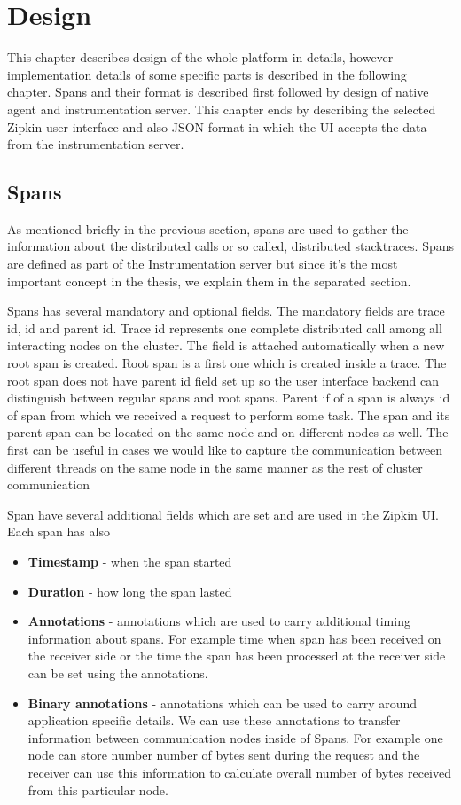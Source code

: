 \chapter{Design}
This chapter describes design of the whole platform in details, however implementation details of some specific parts is described in the following chapter. Spans and their format is described first followed by design of native agent and instrumentation server. This chapter ends by describing the selected Zipkin user interface and also JSON format in which the UI accepts the data from the instrumentation server.
\label{chap:design}

\section{Spans}
\label{subsec:spans}
As mentioned briefly in the previous section, spans are used to gather the information about the distributed calls or so called, distributed stacktraces. Spans are defined as part of the Instrumentation server but since it's the most important concept in the thesis, we explain them in the separated section. 

Spans has several mandatory and optional fields. The mandatory fields are trace id, id and parent id. Trace id represents one complete distributed call among all interacting nodes on the cluster. The field is attached automatically when a new root span is created. Root span is a first one which is created inside a trace. The root span does not have parent id field set up so the user interface backend can distinguish between regular spans and root spans. Parent if of a span is always id of span from which we received a request to perform some task. The span and its parent span can be located on the same node and on different nodes as well. The first can be useful in cases we would like to capture the communication between different threads on the same node in the same manner as the rest of cluster communication

Span have several additional fields which are set and are used in the Zipkin UI. Each span has also
\begin{itemize}
	\item \textbf{Timestamp} - when the span started
	\item \textbf{Duration} - how long the span lasted
	\item \textbf{Annotations} - annotations which are used to carry additional timing information about spans. For example time when span has been received on the receiver side or the time the span has been processed at the receiver side can be set using the annotations.
	\item \textbf{Binary annotations} - annotations which can be used to carry around application specific details. We can use these annotations to transfer information between communication nodes inside of Spans. For example one node can store number number of bytes sent during the request and the receiver can use this information to calculate overall number of bytes received from this particular node.
\end{itemize}

